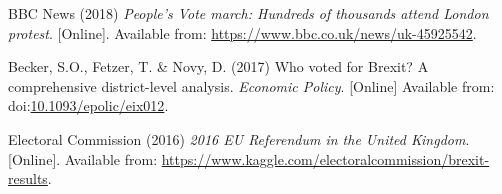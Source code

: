 \documentclass[]{article}
\begin{document}
\hypertarget{refs}{}
\leavevmode\hypertarget{ref-BBCNews2018}{}%
BBC News (2018) \emph{People's Vote march: Hundreds of thousands attend
London protest}. {[}Online{]}. Available from:
\url{https://www.bbc.co.uk/news/uk-45925542}.

\leavevmode\hypertarget{ref-Becker2017}{}%
Becker, S.O., Fetzer, T. \& Novy, D. (2017) Who voted for Brexit? A
comprehensive district-level analysis. \emph{Economic Policy}.
{[}Online{]} Available from:
doi:\href{https://doi.org/10.1093/epolic/eix012}{10.1093/epolic/eix012}.

\leavevmode\hypertarget{ref-ElectoralCommission2016}{}%
Electoral Commission (2016) \emph{2016 EU Referendum in the United
Kingdom}. {[}Online{]}. Available from:
\url{https://www.kaggle.com/electoralcommission/brexit-results}.
\end{document}
